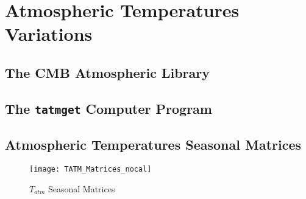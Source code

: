 \chapter{Atmospheric Temperatures Variations}

\section{The CMB Atmospheric Library}

\section{The \texttt{tatmget} Computer Program}

\section{Atmospheric Temperatures Seasonal Matrices}

\begin{figure}
        \centering
        \texttt{[image: TATM\_Matrices\_nocal]}
        \caption{$T_{atm}$ Seasonal Matrices}
        \label{fig:tatm_matrices_nocal}
\end{figure}

